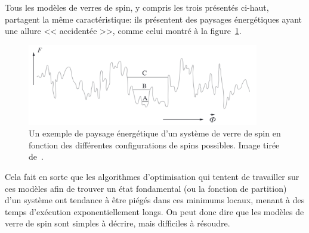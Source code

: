Tous les modèles de verres de spin, y compris les trois présentés ci-haut, partagent la même caractéristique: ils présentent des paysages énergétiques ayant une allure << accidentée >>, comme celui montré à la figure~\ref{fig:spin-glass-rugged-energy-landscape}. %
\begin{figure}[h]
    \centering
    \includegraphics[width=0.9\textwidth]{Figures/spin-glass-rugged-energy-landscape.png}
    \caption[Un exemple de paysage énergétique d'un système de verre de spin.]{Un exemple de paysage énergétique d'un système de verre de spin en fonction des différentes configurations de spins possibles. Image tirée de~\protect\cite{stein2013spin}.}
    \label{fig:spin-glass-rugged-energy-landscape}
\end{figure}
Cela fait en sorte que les algorithmes d'optimisation qui tentent de travailler sur ces modèles afin de trouver un état fondamental (ou la fonction de partition) d'un système ont tendance à être piégés dans ces minimums locaux, menant à des temps d'exécution exponentiellement longs.
On peut donc dire que les modèles de verre de spin sont simples à décrire, mais difficiles à résoudre.

